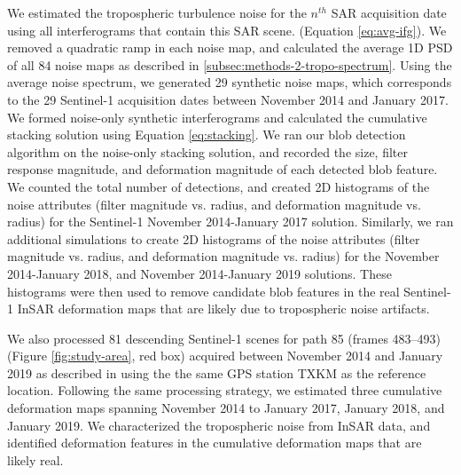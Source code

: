 \documentclass{utexasthesis}
\begin{document}
We estimated the tropospheric turbulence noise for the $n^{th}$ SAR acquisition date using all interferograms that contain this SAR scene. (Equation \eqref{eq:avg-ifg}). We removed a quadratic ramp in each noise map, and calculated the average 1D PSD of all 84 noise maps as described in \ref{subsec:methods-2-tropo-spectrum}.
Using the average noise spectrum, we generated 29 synthetic noise maps, which corresponds to the 29 Sentinel-1 acquisition dates between November 2014 and January 2017. We formed noise-only synthetic interferograms and calculated the cumulative stacking solution using Equation \eqref{eq:stacking}. We ran our blob detection algorithm on the noise-only stacking solution, and recorded the size, filter response magnitude, and deformation magnitude of each detected blob feature. We counted the total number of detections, and created 2D histograms of the noise attributes (filter magnitude vs. radius, and deformation magnitude vs. radius) for the Sentinel-1 November 2014-January 2017 solution.
Similarly, we ran additional simulations to create 2D histograms of the noise attributes (filter magnitude vs. radius, and deformation magnitude vs. radius) for the November 2014-January 2018, and November 2014-January 2019 solutions.
These histograms were then used to remove candidate blob features in the real Sentinel-1 InSAR deformation maps that are likely due to tropospheric noise artifacts.

We also processed 81 descending Sentinel-1 scenes for path 85 (frames 483–493) (Figure \ref{fig:study-area}, red box) acquired between November 2014 and January 2019 as described in \citep{Staniewicz2020InsarRevealsComplex} using the the same GPS station TXKM as the reference location. Following the same processing strategy, we estimated three cumulative deformation maps spanning November 2014 to January 2017, January 2018, and January 2019. We characterized the tropospheric noise from InSAR data, and identified deformation features in the cumulative deformation maps that are likely real.
\end{document}
